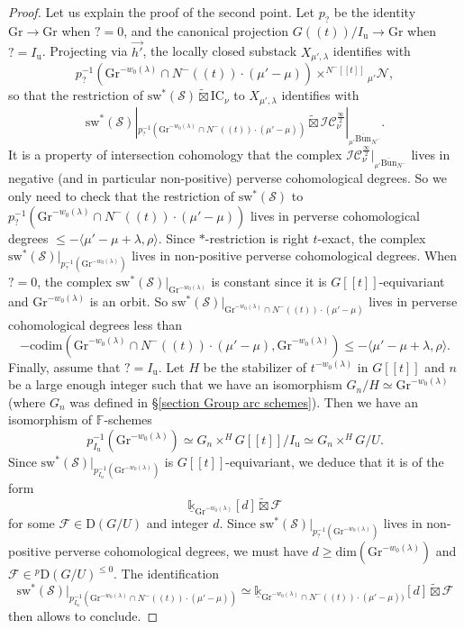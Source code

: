 \documentclass[11pt]{amsart}
\theoremstyle{plain}
\theoremstyle{remark}
\numberwithin{equation}{section}
\begin{document}
\begin{proof}
		Let us explain the proof of the second point.
		Let $p_?$ be the identity $\mathrm{Gr}\to\mathrm{Gr}$ when $?=0$, and the canonical projection $G((t))/I_{\mathrm{u}}\to\mathrm{Gr}$ when $?=I_\mathrm{u}$. Projecting via $\overset{\rightarrow}{h'}$, the locally closed substack $X_{\mu',\lambda}$  identifies with
		$$p_?^{-1}(\mathrm{Gr}^{-w_0(\lambda)}\cap N^-((t))\cdot(\mu'-\mu))\times^{N^-[[t]]} {_{\mu'}\mathcal{N}},$$
		so that the restriction of $\mathrm{sw}^*(\mathcal{S})\widetilde{\boxtimes}\mathrm{IC}_\nu$ to $X_{\mu',\lambda}$ identifies with
		$$\mathrm{sw}^*(\mathcal{S})|_{p_?^{-1}(\mathrm{Gr}^{-w_0(\lambda)}\cap N^-((t))\cdot(\mu'-\mu))}\widetilde{\boxtimes}\mathcal{IC}^{\frac{\infty}{2}}_\nu|_{{_{\mu'}\overline{\mathrm{Bun}}_{N^-}}}. $$
		It is a property of intersection cohomology that the complex $\mathcal{IC}^{\frac{\infty}{2}}_\nu|_{{_{\mu'}\overline{\mathrm{Bun}}_{N^-}}}$ lives in negative (and in particular non-positive) perverse cohomological degrees. So we only need to check that the restriction of $\mathrm{sw}^*(\mathcal{S})$ to ${p_?^{-1}(\mathrm{Gr}^{-w_0(\lambda)}\cap N^-((t))\cdot(\mu'-\mu))}$ lives in perverse cohomological degrees $\leq -\langle \mu'-\mu+\lambda,\rho\rangle$. Since $*$-restriction is right $t$-exact, the complex $\mathrm{sw}^*(\mathcal{S})|_{p_?^{-1}(\mathrm{Gr}^{-w_0(\lambda)})}$ lives in non-positive perverse cohomological degrees. When $?=0$, the complex $\mathrm{sw}^*(\mathcal{S})|_{\mathrm{Gr}^{-w_0(\lambda)}}$ is constant since it is $G[[t]]$-equivariant and $\mathrm{Gr}^{-w_0(\lambda)}$ is an orbit. So $\mathrm{sw}^*(\mathcal{S})|_{\mathrm{Gr}^{-w_0(\lambda)}\cap N^-((t))\cdot(\mu'-\mu)}$ lives in perverse cohomological degrees less than
		$$-\mathrm{codim}(\mathrm{Gr}^{-w_0(\lambda)}\cap N^-((t))\cdot(\mu'-\mu),\mathrm{Gr}^{-w_0(\lambda)})\leq -\langle \mu'-\mu+\lambda,\rho\rangle. $$
		Finally, assume that $?=I_\mathrm{u}$. Let $H$ be the stabilizer of $t^{-w_0(\lambda)}$ in $G[[t]]$ and  $n$ be a large enough integer such that we have an isomorphism $G_n/H\simeq \mathrm{Gr}^{-w_0(\lambda)}$ (where $G_n$ was defined in §\ref{section Group arc schemes}). Then we have an isomorphism of $\mathbb{F}$-schemes
		$$p_{I_\mathrm{u}}^{-1}(\mathrm{Gr}^{-w_0(\lambda)})\simeq  G_n\times^{H}G[[t]]/I_\mathrm{u}\simeq G_n\times^{H}G/U.$$
		Since $\mathrm{sw}^*(\mathcal{S})|_{p_{I_\mathrm{u}}^{-1}(\mathrm{Gr}^{-w_0(\lambda)})}$ is $G[[t]]$-equivariant, we deduce that it is of the form 
  $$\underline{\mathbb{k}}_{\mathrm{Gr}^{-w_0(\lambda)}}[d]\widetilde{\boxtimes} \mathcal{F}$$ 
  for some $\mathcal{F}\in\mathrm{D}(G/U)$ and integer $d$. Since $\mathrm{sw}^*(\mathcal{S})|_{p_?^{-1}(\mathrm{Gr}^{-w_0(\lambda)})}$ lives in non-positive perverse cohomological degrees, we must have $d\geq \mathrm{dim}(\mathrm{Gr}^{-w_0(\lambda)})$ and $\mathcal{F}\in{^p\mathrm{D}}(G/U)^{\leq0}$. The identification $$\mathrm{sw}^*(\mathcal{S})|_{p_{I_\mathrm{u}}^{-1}(\mathrm{Gr}^{-w_0(\lambda)}\cap N^-((t))\cdot(\mu'-\mu))}\simeq \underline{\mathbb{k}}_{\mathrm{Gr}^{-w_0(\lambda)}\cap N^-((t))\cdot(\mu'-\mu))}[d]\widetilde{\boxtimes} \mathcal{F}$$ then allows to conclude.
	\end{proof}
\end{document}
